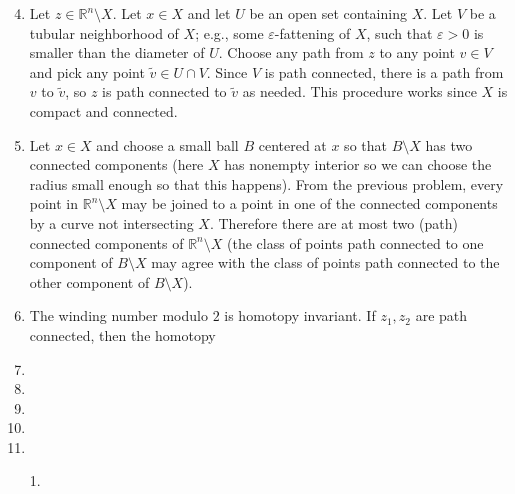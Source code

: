 \documentclass[11pt,leqno]{article}
\theoremstyle{plain}
\theoremstyle{definition}
\numberwithin{equation}{section}
\numberwithin{lem}{section}
\begin{document}
\begin{enumerate}
    \setcounter{enumi}{3}
    \item Let $z\in \mathbb R^n\setminus X$. Let $x\in X$ and let $U$ be an open set containing $X$. Let $V$ be a tubular neighborhood of $X$; e.g., some $\varepsilon$-fattening of $X$, such that $\varepsilon>0$ is smaller than the diameter of $U$. Choose any path from $z$ to any point $v\in V$ and pick any point $\tilde v \in U\cap V$. Since $V$ is path connected, there is a path from $v$ to $\tilde v$, so $z$ is path connected to $\tilde v$ as needed. This procedure works since $X$ is compact and connected.
    \item Let $x\in X$ and choose a small ball $B$ centered at $x$ so that $B\setminus X$ has two connected components (here $X$ has nonempty interior so we can choose the radius small enough so that this happens). From the previous problem, every point in $\mathbb R^n\setminus X$ may be joined to a point in one of the connected components by a curve not intersecting $X$. Therefore there are at most two (path) connected components of $\mathbb R^n\setminus X$ (the class of points path connected to one component of $B\setminus X$ may agree with the class of points path connected to the other component of $B\setminus X$).
    \item The winding number modulo $2$ is homotopy invariant. If $z_1,z_2$ are path connected, then the homotopy 
    \item 
    \item 
    \item 
    \item 
    \item 
    \item[1.] 
\end{enumerate}
\end{document}
